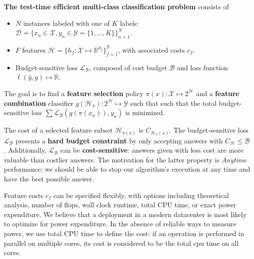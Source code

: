\begin{mydef} \label{def:problem}
\textbf{The test-time efficient multi-class classification problem} consists of

\begin{itemize}
\addtolength{\itemsep}{-.55\baselineskip}
\item
$N$ instances labeled with one of $K$ labels: ${\mathcal{D} = \{x_n \in \mathcal{X}, y_n \in \mathcal{Y} = \{1, \dots, K\}\}_{n=1}^N}$.

\item
$F$ features $\mathcal{H} = \{h_f : \mathcal{X} \mapsto \mathbb{R}^{d_f} \}_{f=1}^F$, with associated costs $c_f$.

\item Budget-sensitive loss $\mathcal{L}_\mathcal{B}$, composed of cost budget $\mathcal{B}$ and loss function ${\ell(\hat{y}, y) \mapsto \mathbb{R}}$.
\end{itemize}

The goal is to find a \textbf{feature selection} policy $\pi(x): \mathcal{X} \mapsto 2^\mathcal{H}$ and a \textbf{feature combination} classifier $g(\mathcal{H}_\pi) : 2^\mathcal{H} \mapsto \mathcal{Y}$ such that such that the total budget-sensitive loss $\sum \mathcal{L}_\mathcal{B}(g(\pi(x_n)), y_n)$ is minimized.
\end{mydef}


The cost of a selected feature subset $\mathcal{H}_{\pi(x)}$ is $C_{\mathcal{H}_\pi(x)}$.
The budget-sensitive loss $\mathcal{L}_\mathcal{B}$ presents a \textbf{hard budget constraint} by only accepting answers with $C_{\mathcal{H}} \leq \mathcal{B}$.
Additionally, $\mathcal{L}_\mathcal{B}$ can be \textbf{cost-sensitive}: answers given with less cost are more valuable than costlier answers.
The motivation for the latter property is \emph{Anytime} performance; we should be able to stop our algorithm's execution at any time and have the best possible answer.

Feature costs $c_f$ can be specified flexibly, with options including theoretical analysis, number of flops, wall clock runtime, total CPU time, or exact power expenditure.
We believe that a deployment in a modern datacenter is most likely to optimize for power expenditure.
In the absence of reliable ways to measure power, we use total CPU time to define the cost: if an operation is performed in parallel on multiple cores, its cost is considered to be the total cpu time on all cores.

